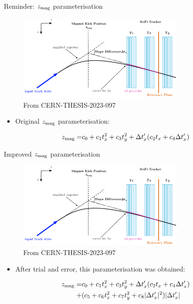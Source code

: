 \documentclass[xcolor={dvipsnames}]{beamer}
\begin{document}
\begin{frame}{Reminder: $z_{\rm mag}$ parameterisation}
  \vspace{0.0cm}
  \begin{figure}[htb]
    \centering
    \includegraphics[width=0.75\textwidth]{Plots/MagnetKinkPosition.png}
    \caption*{\small From CERN-THESIS-2023-097}
  \end{figure}
  \begin{itemize}
    \item{Original $z_{\rm mag}$ parameterisation:}
  \end{itemize}
  \begin{align*}
    z_{\rm mag} =& c_0 + c_1t_x^2 + c_3t_y^2 + \Delta t_x^\prime(c_2t_x + c_4\Delta t_x^\prime) \\
  \end{align*}
\end{frame}

\begin{frame}{Improved $z_{\rm mag}$ parameterisation}
  \vspace{0.0cm}
  \begin{figure}[htb]
    \centering
    \includegraphics[width=0.75\textwidth]{Plots/MagnetKinkPosition.png}
    \caption*{\small From CERN-THESIS-2023-097}
  \end{figure}
  \begin{itemize}
    \item{After trial and error, this parameterisation was obtained:}
  \end{itemize}
  \begin{align*}
    z_{\rm mag} =& c_0 + c_1t_x^2 + c_3t_y^2 + \Delta t_x^\prime(c_2t_x + c_4\Delta t_x^\prime) \\
    +& (c_5 + c_6t_x^2 + c_7t_y^2 + c_8\lvert\Delta t_x^\prime\rvert^2)\lvert\Delta t_x^\prime\rvert
  \end{align*}
\end{frame}
\end{document}
